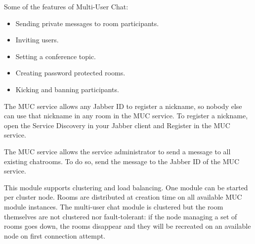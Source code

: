 \documentclass[a4paper,10pt]{book}
\begin{document}
Some of the features of Multi-User Chat:
\begin{itemize}
\item Sending private messages to room participants.
\item Inviting users.
\item Setting a conference topic.
\item Creating password protected rooms.
\item Kicking and banning participants.
\end{itemize}

The MUC service allows any Jabber ID to register a nickname,
so nobody else can use that nickname in any room in the MUC service.
To register a nickname, open the Service Discovery in your 
Jabber client and Register in the MUC service.

The MUC service allows the service administrator to send a message
to all existing chatrooms. 
To do so, send the message to the Jabber ID of the MUC service.

This module supports clustering and load
balancing. One module can be started per cluster node. Rooms are
distributed at creation time on all available MUC module
instances. The multi-user chat module is clustered but the room
themselves are not clustered nor fault-tolerant: if the node managing a
set of rooms goes down, the rooms disappear and they will be recreated
on an available node on first connection attempt.
\end{document}
